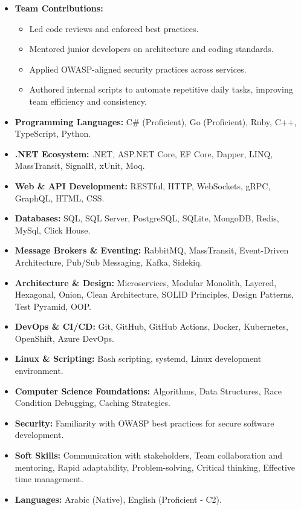 \documentclass[11pt]{article}
\newcommand{\fancysection}[1]{%
  \vspace{.5em}
  \noindent
  \makebox[\linewidth]{%
    \leavevmode
    \leaders\hrule height 0.4pt\hfill
    \hspace{0.8em}
    \textbf{#1}
    \hspace{0.8em}
    \leaders\hrule height 0.4pt\hfill
  }%
  \vspace{.2em}
}
\begin{document}
\begin{itemize}[left=0pt]
\begin{itemize}[left=0pt]
      \item \textbf{Team Contributions:}
        \begin{itemize}
          \item Led code reviews and enforced best practices.
          \item Mentored junior developers on architecture and coding standards.
          \item Applied OWASP-aligned security practices across services.
          \item Authored internal scripts to automate repetitive
            daily tasks, improving team efficiency and consistency.
        \end{itemize}
    \end{itemize}

\end{itemize}
\vspace{2.1em}

\fancysection{Skills}
\begin{itemize}[left=0pt]
  \item \textbf{Programming Languages:} C\# (Proficient), Go
    (Proficient), Ruby, C++, TypeScript, Python.
  \item \textbf{.NET Ecosystem:} .NET, ASP.NET Core, EF Core, Dapper, LINQ, MassTransit, SignalR, xUnit, Moq.
  \item \textbf{Web \& API Development:} RESTful, HTTP,
    WebSockets, gRPC, GraphQL, HTML, CSS.
  \item \textbf{Databases:} SQL, SQL Server, PostgreSQL, SQLite,
    MongoDB, Redis, MySql, Click House.
  \item \textbf{Message Brokers \& Eventing:} RabbitMQ, MassTransit,
    Event-Driven Architecture, Pub/Sub Messaging, Kafka, Sidekiq.
  \item \textbf{Architecture \& Design:} Microservices, Modular
    Monolith, Layered, Hexagonal, Onion, Clean Architecture, SOLID
    Principles, Design Patterns, Test Pyramid, OOP.
  \item \textbf{DevOps \& CI/CD:} Git, GitHub, GitHub Actions,
    Docker, Kubernetes, OpenShift, Azure DevOps.
  \item \textbf{Linux \& Scripting:} Bash scripting, systemd, Linux
    development environment.
  \item \textbf{Computer Science Foundations:} Algorithms, Data
    Structures, Race Condition Debugging, Caching Strategies.
  \item \textbf{Security:} Familiarity with OWASP best practices for
    secure software development.
  \item \textbf{Soft Skills:} Communication with stakeholders, Team
    collaboration and mentoring, Rapid adaptability, Problem-solving,
    Critical thinking, Effective time management.
  \item \textbf{Languages:} Arabic (Native), English (Proficient - C2).
\end{itemize}
\vspace{0em}
\end{document}
